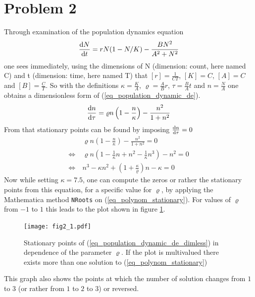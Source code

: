 \documentclass[12pt, a4paper]{article}
\begin{document}
  \section*{Problem 2}
  Through examination of the population dynamics equation
  \begin{align}
    \frac{{\rm d} N}{{\rm d} t} = r N (1 - N / K) - \frac{B N^2}{A^2+N^2}
    \label{eq_population_dynamic_de}
  \end{align}
  one sees immediately, using the dimensions of N (dimension: count, here named C) and t (dimension: time, here named T) that $[r] = \frac{1}{C T}$, $[K] = C$, $[A] = C$ and $[B] = \frac{C}{T}$. So with the definitions $\kappa = \frac{K}{A}$, $\varrho = \frac{A}{B} r$, $\tau = \frac{B}{A} t$ and $n = \frac{N}{A}$ one obtains a dimensionless form of (\ref{eq_population_dynamic_de}).
  \begin{align}
    \frac{{\rm d} n}{{\rm d} \tau} = \varrho n \left(1 - \frac{n}{\kappa} \right)
      - \frac{n^2}{1 + n^2}
    \label{eq_population_dynamic_de_dimless}
  \end{align}
  From that stationary points can be found by imposing $\frac{{\rm d} n}{{\rm d} \tau} = 0$
  \begin{align}
    & \varrho n \left(1 - \frac{n}{\kappa} \right)
      - \frac{n^2}{1 + n^2} = 0 \nonumber \\
    \Leftrightarrow \ & \varrho n \left(1 - \frac{1}{\kappa} n + n^2
      - \frac{1}{\kappa} n^3 \right) - n^2 = 0 \nonumber \\
    \Leftrightarrow \ & n^3 - \kappa n^2
      + \left(1 + \frac{\kappa}{\varrho}\right) n - \kappa = 0
    \label{eq_polynom_stationary}
  \end{align}
  Now while setting $\kappa = 7.5$, one can compute the zeros or rather the stationary points from this equation, for a specific value for $\varrho$, by applying the Mathematica method \texttt{NRoots} on (\ref{eq_polynom_stationary}). For values of $\varrho$ from $-1$ to $1$ this leads to the plot shown in figure \ref{fig_stationary_points}.

  \begin{figure}[h]
    \centering
    \texttt{[image: fig2\_1.pdf]}
    \caption{Stationary points of (\ref{eq_population_dynamic_de_dimless}) in dependence of the parameter $\varrho$. If the plot is multivalued there exists more than one solution to (\ref{eq_polynom_stationary})}
    \label{fig_stationary_points}
  \end{figure}

  This graph also shows the points at which the number of solution changes from $1$ to $3$ (or rather from $1$ to $2$ to $3$) or reversed.
\end{document}
